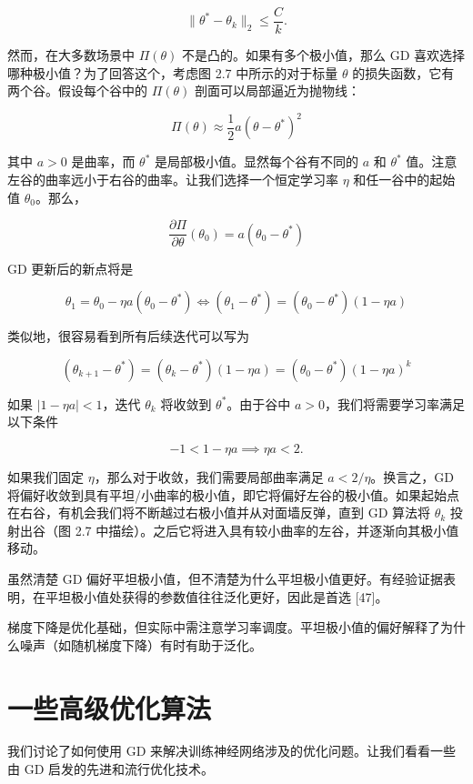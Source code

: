 \[
\| \theta^* - \theta_k \|_2 \leq \frac{C}{k}.
\]

然而，在大多数场景中 $\Pi(\theta)$ 不是凸的。如果有多个极小值，那么 GD 喜欢选择哪种极小值？为了回答这个，考虑图 2.7 中所示的对于标量 $\theta$ 的损失函数，它有两个谷。假设每个谷中的 $\Pi(\theta)$ 剖面可以局部逼近为抛物线：

\[
\Pi(\theta) \approx \frac{1}{2} a (\theta - \theta^*)^2
\]

其中 $a > 0$ 是曲率，而 $\theta^*$ 是局部极小值。显然每个谷有不同的 $a$ 和 $\theta^*$ 值。注意左谷的曲率远小于右谷的曲率。让我们选择一个恒定学习率 $\eta$ 和任一谷中的起始值 $\theta_0$。那么，

\[
\frac{\partial \Pi}{\partial \theta}(\theta_0) = a (\theta_0 - \theta^*)
\]

GD 更新后的新点将是

\[
\theta_1 = \theta_0 - \eta a (\theta_0 - \theta^*) \iff (\theta_1 - \theta^*) = (\theta_0 - \theta^*)(1 - \eta a)
\]

类似地，很容易看到所有后续迭代可以写为

\[
(\theta_{k+1} - \theta^*) = (\theta_k - \theta^*)(1 - \eta a) = (\theta_0 - \theta^*)(1 - \eta a)^k
\]

如果 $|1 - \eta a| < 1$，迭代 $\theta_k$ 将收敛到 $\theta^*$。由于谷中 $a > 0$，我们将需要学习率满足以下条件

\[
-1 < 1 - \eta a \implies \eta a < 2.
\]

如果我们固定 $\eta$，那么对于收敛，我们需要局部曲率满足 $a < 2/\eta$。换言之，GD 将偏好收敛到具有平坦/小曲率的极小值，即它将偏好左谷的极小值。如果起始点在右谷，有机会我们将不断越过右极小值并从对面墙反弹，直到 GD 算法将 $\theta_k$ 投射出谷（图 2.7 中描绘）。之后它将进入具有较小曲率的左谷，并逐渐向其极小值移动。

虽然清楚 GD 偏好平坦极小值，但不清楚为什么平坦极小值更好。有经验证据表明，在平坦极小值处获得的参数值往往泛化更好，因此是首选 [47]。

\begin{mycomment}
梯度下降是优化基础，但实际中需注意学习率调度。平坦极小值的偏好解释了为什么噪声（如随机梯度下降）有时有助于泛化。
\end{mycomment}

\section{一些高级优化算法}

我们讨论了如何使用 GD 来解决训练神经网络涉及的优化问题。让我们看看一些由 GD 启发的先进和流行优化技术。

